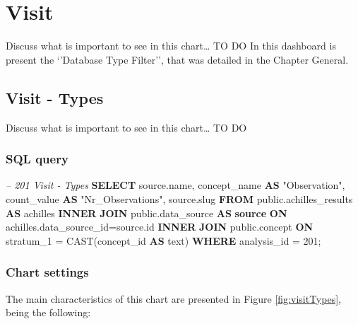\documentclass[]{book}
\newenvironment{Shaded}{\begin{snugshade}}{\end{snugshade}}
\newcommand{\KeywordTok}[1]{\textcolor[rgb]{0.13,0.29,0.53}{\textbf{#1}}}
\newcommand{\DecValTok}[1]{\textcolor[rgb]{0.00,0.00,0.81}{#1}}
\newcommand{\CommentTok}[1]{\textcolor[rgb]{0.56,0.35,0.01}{\textit{#1}}}
\newcommand{\OtherTok}[1]{\textcolor[rgb]{0.56,0.35,0.01}{#1}}
\newcommand{\FunctionTok}[1]{\textcolor[rgb]{0.00,0.00,0.00}{#1}}
\newcommand{\NormalTok}[1]{#1}
\begin{document}
\chapter{Visit}\label{visit}

Discuss what is important to see in this chart\ldots{} TO DO In this
dashboard is present the `'Database Type Filter'', that was detailed in
the Chapter General.

\section{Visit - Types}\label{visit---types}

Discuss what is important to see in this chart\ldots{} TO DO

\subsection{SQL query}\label{sql-query-13}

\begin{Shaded}
\begin{Highlighting}[]
\CommentTok{-- 201  Visit - Types}
\KeywordTok{SELECT}\NormalTok{ source.name, }
\NormalTok{       concept_name }\KeywordTok{AS} \OtherTok{"Observation"}\NormalTok{, }
\NormalTok{       count_value }\KeywordTok{AS} \OtherTok{"Nr_Observations"}\NormalTok{,}
\NormalTok{       source.slug}
\KeywordTok{FROM}\NormalTok{ public.achilles_results }\KeywordTok{AS}\NormalTok{ achilles }
    \KeywordTok{INNER} \KeywordTok{JOIN}\NormalTok{ public.data_source }\KeywordTok{AS} \KeywordTok{source} \KeywordTok{ON} 
\NormalTok{      achilles.data_source_id=source.id}
    \KeywordTok{INNER} \KeywordTok{JOIN}\NormalTok{ public.concept }\KeywordTok{ON} 
\NormalTok{      stratum_1 = }\FunctionTok{CAST}\NormalTok{(concept_id }\KeywordTok{AS}\NormalTok{ text)}
\KeywordTok{WHERE}\NormalTok{ analysis_id = }\DecValTok{201}\NormalTok{;}
\end{Highlighting}
\end{Shaded}

\subsection{Chart settings}\label{chart-settings-13}

The main characteristics of this chart are presented in Figure
\ref{fig:visitTypes}, being the following:
\end{document}
